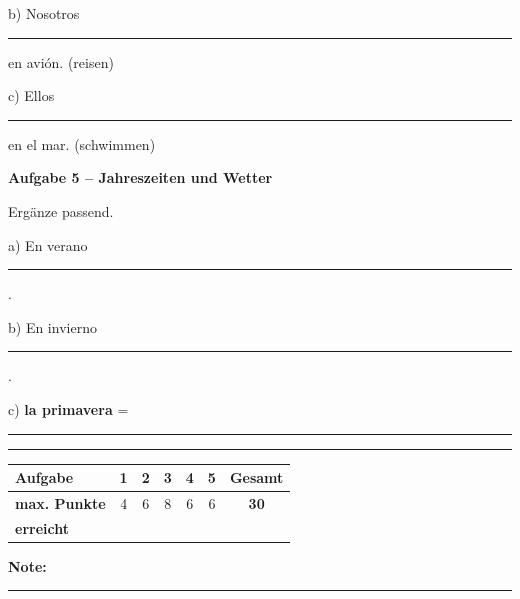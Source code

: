 \documentclass[11pt, a4paper]{article}
\newcommand{\fachfarbe}{spanisch}
\newcommand{\punktebox}[1]{\hfill\fbox{\small \_/#1}}
\newcommand{\luecke}[1]{\rule{#1}{0.4pt}}
\newenvironment{aufgabe}[1]{%
    \needspace{5\baselineskip}%
    \nopagebreak[4]%
    \vspace{10pt}
    \noindent\textbf{\textcolor{\fachfarbe}{Aufgabe #1}}
    \nopagebreak[4]%
    \vspace{5pt}
    \nopagebreak[4]%
    \begin{list}{}{\leftmargin=0pt}
    \item[]
}{%
    \end{list}
}
\newcommand{\es}[1]{\textcolor{\fachfarbe}{\textbf{#1}}}
\begin{document}
\noindent
b) Nosotros \luecke{5cm} en avión. \hfill (reisen)

\vspace{0.8em}

\noindent
c) Ellos \luecke{5cm} en el mar. \hfill (schwimmen)

\vspace{15pt}


\begin{aufgabe}{5 -- Jahreszeiten und Wetter}
Ergänze passend. \punktebox{6}
\end{aufgabe}

\noindent
a) En verano \luecke{6cm}.

\vspace{0.8em}

\noindent
b) En invierno \luecke{6cm}.

\vspace{0.8em}

\noindent
c) \es{la primavera} = \luecke{4cm}


\vspace{25pt}
\hrule
\vspace{10pt}

\noindent
\begin{tabularx}{\textwidth}{|X|c|c|c|c|c||c|}
\hline
\textbf{Aufgabe} & 1 & 2 & 3 & 4 & 5 & \textbf{Gesamt} \\
\hline
\textbf{max. Punkte} & 4 & 6 & 8 & 6 & 6 & \textbf{30} \\
\hline
\textbf{erreicht} & & & & & & \\[0.8em]
\hline
\end{tabularx}

\vspace{10pt}

\begin{flushright}
\textbf{Note:} \luecke{2cm}
\end{flushright}
\end{document}
